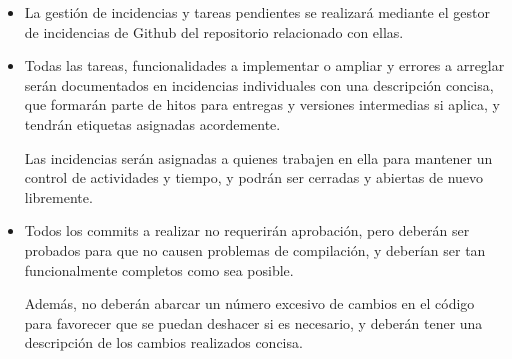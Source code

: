 \documentclass[12pt, a4paper, titlepage]{article}
\begin{document}
\begin{itemize}
\begin{itemize}
        \item Un repositorio para el frontend de React\footnote{\href{https://github.com/UNIZAR-30226-2022-01/proyecto_software_frontend_react}{\color{blue}{Repositorio del frontend de React}}}, en el cual se localizará todo el código y ficheros para el despliegue relativo al frontend de React.
        
        \item Un repositorio para el frontend de Angular \footnote{\href{https://github.com/UNIZAR-30226-2022-01/proyecto_software_frontend_angular}{\color{blue}{Repositorio del frontend de Angular}}}, en el cual se localizará todo el código y ficheros para el despliegue relativo al frontend de Angular.
        
        \item Un repositorio para la documentación pública \footnote{\href{https://github.com/UNIZAR-30226-2022-01/proyecto_software_documentacion}{\color{blue}{Repositorio de documentación pública}}}, en el cual se localizarán todos los archivos de documentación interna o para los clientes finales y parciales, como archivos de \LaTeX.
    \end{itemize}
    
    \item La gestión de incidencias y tareas pendientes se realizará mediante el gestor de incidencias de Github del repositorio relacionado con ellas.
    
    \item Todas las tareas, funcionalidades a implementar o ampliar y errores a arreglar serán documentados en incidencias individuales con una descripción concisa, que formarán parte de hitos para entregas y versiones intermedias si aplica, y tendrán etiquetas asignadas acordemente.
    
    Las incidencias serán asignadas a quienes trabajen en ella para mantener un control de actividades y tiempo, y podrán ser cerradas y abiertas de nuevo libremente.
    
    \item Todos los commits a realizar no requerirán aprobación, pero deberán ser probados para que no causen problemas de compilación, y deberían ser tan funcionalmente completos como sea posible. 
    
    Además, no deberán abarcar un número excesivo de cambios en el código para favorecer que se puedan deshacer si es necesario, y deberán tener una descripción de los cambios realizados concisa.
    
    
\end{itemize}
\end{document}

